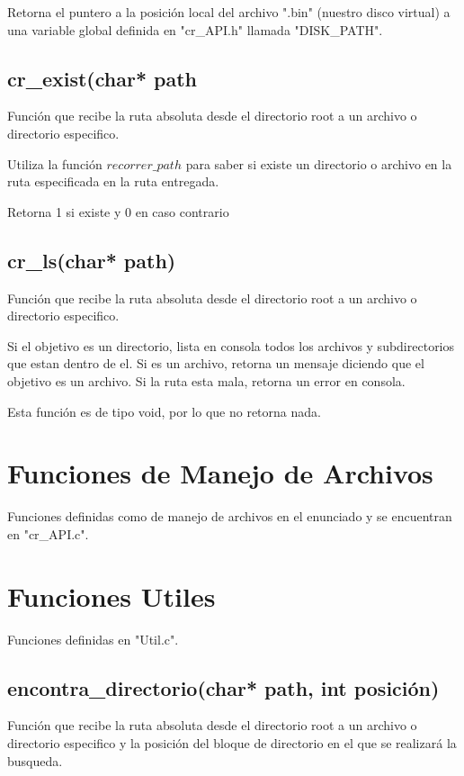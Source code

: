 \documentclass[12pt]{article}
\begin{document}
Retorna el puntero a la posición local del archivo ".bin" (nuestro disco virtual) a una variable global definida en "cr\_API.h" llamada "DISK\_PATH".

\subsection{cr\_exist(char* path}
Función que recibe la ruta absoluta desde el directorio root a un archivo o directorio especifico.

Utiliza la función $recorrer\_path$ para saber si existe un directorio o archivo en la ruta especificada en la ruta entregada.

Retorna 1 si existe y 0 en caso contrario

\subsection{cr\_ls(char* path)}
Función que recibe la ruta absoluta desde el directorio root a un archivo o directorio especifico.

Si el objetivo es un directorio, lista en consola todos los archivos y subdirectorios que estan dentro de el. Si es un archivo, retorna un mensaje diciendo que el objetivo es un archivo. Si la ruta esta mala, retorna un error en consola.

Esta función es de tipo void, por lo que no retorna nada.



\section{Funciones de Manejo de Archivos}
Funciones definidas como de manejo de archivos en el enunciado y se encuentran en "cr\_API.c".


\section{Funciones Utiles}
Funciones definidas en "Util.c".

\subsection{encontra\_directorio(char* path, int posición)}
Función que recibe la ruta absoluta desde el directorio root a un archivo o directorio especifico y la posición del bloque de directorio en el que se realizará la busqueda. 
\end{document}
